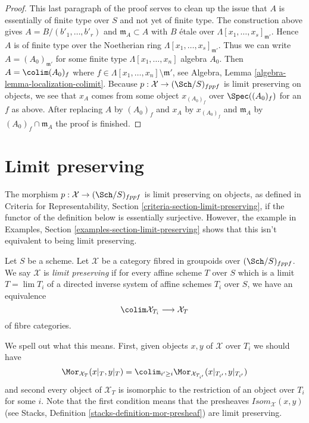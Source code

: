 \begin{proof}
\medskip\noindent
This last paragraph of the proof serves to clean up the issue that $A$ is
essentially of finite type over $S$ and not yet of finite type.
The construction above gives $A = B/(b'_1, \ldots, b'_r)$ and
$\mathfrak m_A \subset A$ with $B$ \'etale over
$\Lambda[x_1, \ldots, x_s]_{\mathfrak m'}$. Hence $A$ is of finite
type over the Noetherian ring $\Lambda[x_1, \ldots, x_s]_{\mathfrak m'}$.
Thus we can write $A = (A_0)_{\mathfrak m'}$ for some finite type
$\Lambda[x_1, \ldots, x_n]$ algebra $A_0$. Then
$A = \colim (A_0)_f$ where
$f \in \Lambda[x_1, \ldots, x_n] \setminus \mathfrak m'$, see
Algebra, Lemma \ref{algebra-lemma-localization-colimit}.
Because $p : \mathcal{X} \to (\Sch/S)_{fppf}$ is limit preserving on
objects, we see that
$x_A$ comes from some object $x_{(A_0)_f}$ over $\Spec((A_0)_f)$ for
an $f$ as above. After replacing $A$ by $(A_0)_f$ and $x_A$ by
$x_{(A_0)_f}$ and $\mathfrak m_A$ by $(A_0)_f \cap \mathfrak m_A$
the proof is finished.
\end{proof}





\section{Limit preserving}
\label{section-limits}

\noindent
The morphism $p : \mathcal{X} \to (\Sch/S)_{fppf}$ is limit preserving
on objects, as defined in Criteria for Representability, Section
\ref{criteria-section-limit-preserving}, if the functor of the definition
below is essentially surjective. However, the example
in Examples, Section \ref{examples-section-limit-preserving}
shows that this isn't equivalent to being limit preserving.

\begin{definition}
\label{definition-limit-preserving}
Let $S$ be a scheme. Let $\mathcal{X}$ be a category fibred in groupoids
over $(\Sch/S)_{fppf}$. We say $\mathcal{X}$ is {\it limit preserving}
if for every affine scheme $T$ over $S$ which is a limit $T = \lim T_i$
of a directed inverse system of affine schemes $T_i$ over $S$, we have
an equivalence
$$
\colim \mathcal{X}_{T_i} \longrightarrow \mathcal{X}_T
$$
of fibre categories.
\end{definition}

\noindent
We spell out what this means. First, given objects $x, y$ of $\mathcal{X}$
over $T_i$ we should have
$$
\Mor_{\mathcal{X}_T}(x|_T, y|_T) =
\colim_{i' \geq i} \Mor_{\mathcal{X}_{T_{i'}}}(x|_{T_{i'}}, y|_{T_{i'}})
$$
and second every object of $\mathcal{X}_T$ is isomorphic to the restriction
of an object over $T_i$ for some $i$. Note that the first condition means
that the presheaves $\mathit{Isom}_\mathcal{X}(x, y)$ (see
Stacks, Definition \ref{stacks-definition-mor-presheaf})
are limit preserving.

